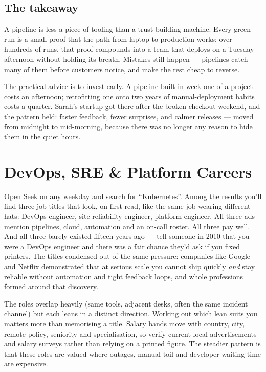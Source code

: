 \subsection{The takeaway}


A pipeline is less a piece of tooling than a trust-building machine. Every green run is a small proof that the path from laptop to production works; over hundreds of runs, that proof compounds into a team that deploys on a Tuesday afternoon without holding its breath. Mistakes still happen — pipelines catch many of them before customers notice, and make the rest cheap to reverse.


The practical advice is to invest early. A pipeline built in week one of a project costs an afternoon; retrofitting one onto two years of manual-deployment habits costs a quarter. Sarah's startup got there after the broken-checkout weekend, and the pattern held: faster feedback, fewer surprises, and calmer releases — moved from midnight to mid-morning, because there was no longer any reason to hide them in the quiet hours.

\section{DevOps, SRE \& Platform Careers}
Open Seek on any weekday and search for ``Kubernetes''. Among the results you'll find three job titles that look, on first read, like the same job wearing different hats: DevOps engineer, site reliability engineer, platform engineer. All three ads mention pipelines, cloud, automation and an on-call roster. All three pay well. And all three barely existed fifteen years ago — tell someone in 2010 that you were a DevOps engineer and there was a fair chance they'd ask if you fixed printers. The titles condensed out of the same pressure: companies like Google and Netflix demonstrated that at serious scale you cannot ship quickly \emph{and} stay reliable without automation and tight feedback loops, and whole professions formed around that discovery.


The roles overlap heavily (same tools, adjacent desks, often the same incident channel) but each leans in a distinct direction. Working out which lean suits you matters more than memorising a title. Salary bands move with country, city, remote policy, seniority and specialisation, so verify current local advertisements and salary surveys rather than relying on a printed figure. The steadier pattern is that these roles are valued where outages, manual toil and developer waiting time are expensive.




